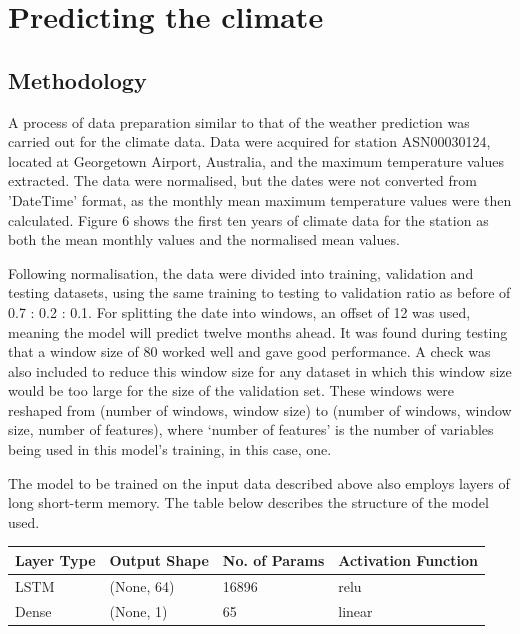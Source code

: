 \documentclass[12pt]{article}
\begin{document}
\section{Predicting the climate}

    \subsection{Methodology}

    A process of data preparation similar to that of the weather prediction was carried out for the climate data. Data were acquired for 
    station ASN00030124, located at Georgetown Airport, Australia, and the maximum temperature values extracted. The data were normalised, 
    but the dates were not converted from 'DateTime' format, as the monthly mean maximum temperature values were then calculated. Figure 6 
    shows the first ten years of climate data for the station as both the mean monthly values and the normalised mean values.
    
    Following normalisation, the data were divided into training, validation and testing datasets, using the same training to testing to 
    validation ratio as before of 0.7 : 0.2 : 0.1. For splitting the date into windows, an offset of 12 was used, meaning the model will 
    predict twelve months ahead. It was found during testing that a window size of 80 worked well and gave good performance. A check was also 
    included to reduce this window size for any dataset in which this window size would be too large for the size of the validation set. 
    These windows were reshaped from (number of windows, window size) to (number of windows, window size, number of features), where 
    ‘number of features’ is the number of variables being used in this model’s training, in this case, one.
    
    The model to be trained on the input data described above also employs layers of long short-term memory. The table below describes the 
    structure of the model used.
    
    \begin{table}[H]
    \centering
        \begin{tabular}{ |p{2.5cm}|p{4cm}|p{3.5cm}|p{4cm}| }
         \hline
         Layer Type & Output Shape & No. of Params & Activation Function \\
         \hline
         LSTM  & (None, 64) &  16896 & relu   \\
         Dense & (None, 1)  &  65    & linear \\
         \hline
        \end{tabular}
    \end{table}
\end{document}
